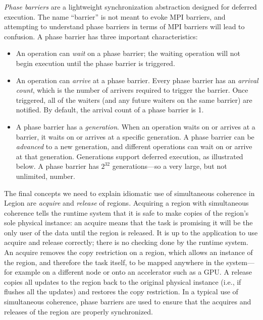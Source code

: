 {\em Phase barriers} are a lightweight synchronization abstraction designed for deferred execution.  The name ``barrier'' is not meant to evoke MPI barriers, and attempting
to understand phase barriers in terms of MPI barriers will lead to confusion.  A phase barrier has three important characteristics:
\begin{itemize}
\item An operation can {\em wait} on a phase barrier; the waiting operation will not begin execution until the phase barrier is triggered.
\item An operation can {\em arrive} at a phase barrier.  Every phase barrier has an {\em arrival count}, which is the number of arrivers required to trigger the barrier.  Once triggered, all of the waiters (and any future waiters on the same barrier) are notified.  By default,
  the arrival count of a phase barrier is 1.
\item A phase barrier has a {\em generation}.  When an operation waits on or arrives at a barrier, it waits on or arrives at a specific generation.  A phase barrier can be {\em advanced} to a new generation, and different operations can wait on or arrive at that
  generation.  Generations support deferred execution, as illustrated below.  A phase barrier has $2^{32}$ generations---so a very large, but not unlimited, number.
\end{itemize}

\begin{figure}
  \centering
  
  \caption{}
  \label{fig:sim}
\end{figure}

The final concepts we need to explain idiomatic use of simultaneous coherence in Legion are {\em acquire} and {\em release} of regions.  Acquiring a region with simultaneous coherence tells the runtime system that it is safe to make copies of the region's sole physical instance: an acquire means that the task is promising it will be the only user of the data until the region is released.  It is up to the application to use acquire and release correctly; there is no checking done by the runtime system.  An acquire removes the copy restriction on a region, which allows
an instance of the region, and therefore the task itself, to be mapped anywhere in the system---for example on a different node or onto an accelerator such as a GPU.
A release copies all updates to the region back to the original physical instance (i.e., if flushes all the updates) and restores the copy restriction.  In a typical use of simultaneous coherence, phase barriers are used to ensure that the acquires and releases of the region
are properly synchronized.

